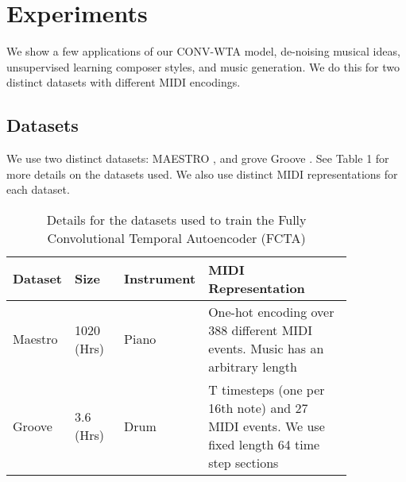 \documentclass[11pt,a4paper]{article}
\begin{document}
\section{Experiments}
\label{ssec:experiments}

We show a few applications of our CONV-WTA model, de-noising musical ideas, unsupervised learning composer styles, and music generation. We do this for two distinct datasets with different MIDI encodings.


\subsection{Datasets}
\label{ssec:experiments}

We use two distinct datasets: MAESTRO  \cite{hawthorne2018enabling}, and  grove Groove  \cite{groove2019} . See Table 1 for more details on the datasets used. We also use distinct MIDI representations for each dataset. 

\begin{table*}[ht]
    \centering
    \begin{tabular}{p{0.15\linewidth} | p{0.15\linewidth} | p{0.1\linewidth}  | p{0.45\linewidth} }
      Dataset  & Size  & Instrument &  MIDI Representation\\ \hline
      Maestro  & 1020 (Hrs)   & Piano &  One-hot encoding over 388 different MIDI events. Music has an arbitrary length \cite{DBLP:journals/corr/abs-1808-03715} \\
        \hline
        Groove & 3.6 (Hrs)  & Drum &  T timesteps (one per 16th note) and 27 MIDI events. We use fixed length 64 time step sections \cite{groove2019} \\
    \end{tabular}
    \caption{Details for the datasets used to train the Fully Convolutional Temporal Autoencoder (FCTA) }
    \label{tab:my_label}
\end{table*}
\end{document}
